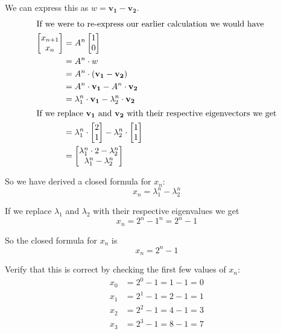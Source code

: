 We can express this as $w = \mathbf{v_1} - \mathbf{v_2}$.\\[2ex]
\begin{align*}
	\intertext{If we were to re-express our earlier calculation we would have}
	\begin{bmatrix}x_{n+1}\\x_n\end{bmatrix} & =  A^n\begin{bmatrix}1\\0\end{bmatrix}                                                                  \\
	                                         & = A^n\cdot w                                                                                            \\
	                                         & = A^n\cdot (\mathbf{v_1}-\mathbf{v_2})                                                                  \\
	                                         & = A^n\cdot \mathbf{v_1}- A^n \cdot \mathbf{v_2}                                                         \\
	                                         & = \lambda_1^n\cdot \mathbf{v_1}- \lambda_2^n \cdot \mathbf{v_2}                                         \\
	\intertext{If we replace $\mathbf{v_1}$ and $\mathbf{v_2}$ with their respective eigenvectors we get}
	                                         & = \lambda_1^n\cdot \begin{bmatrix}2\\1\end{bmatrix}- \lambda_2^n \cdot \begin{bmatrix}1\\1\end{bmatrix} \\
	                                         & = \begin{bmatrix}\lambda_1^{n}\cdot2-\lambda_2^n\\\lambda_1^n-\lambda_2^n\end{bmatrix}
\end{align*}

So we have derived a closed formula for $x_n$:
\[
	x_n = \lambda_1^{n}-\lambda_2^n
\]

If we replace $\lambda_1$ and $\lambda_2$ with their respective eigenvalues we get
\[
	x_n = 2^n-1^n = 2^n-1
\]

So the closed formula for $x_n$ is
\[
	x_n = 2^n-1
\]

Verify that this is correct by checking the first few values of $x_n$:
\begin{align*}
	x_0 & = 2^0-1 = 1-1 = 0 \\
	x_1 & = 2^1-1 = 2-1 = 1 \\
	x_2 & = 2^2-1 = 4-1 = 3 \\
	x_3 & = 2^3-1 = 8-1 = 7
\end{align*}

